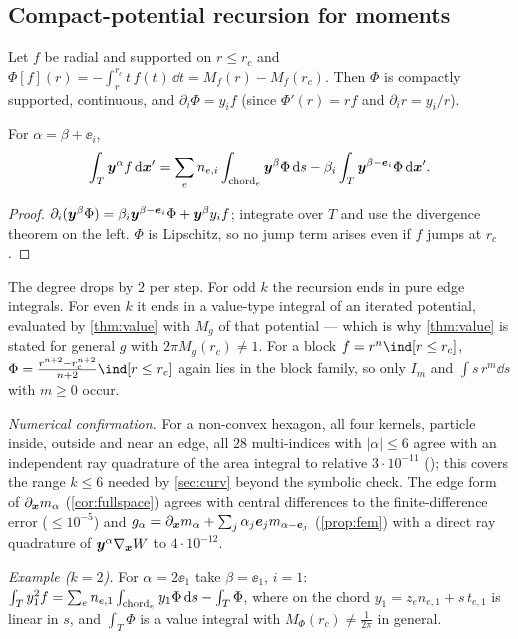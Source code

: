 \subsection{Compact-potential recursion for moments}
Let $f$ be radial and supported on $r\le r_c$ and $\Phi[f](r)=-\int_r^{r_c}t\,f(t)\,\dd t=M_f(r)-M_f(r_c)$. Then $\Phi$ is compactly
supported, continuous, and $\partial_i\Phi=y_if$ (since $\Phi'(r)=rf$ and $\partial_i r=y_i/r$).
\begin{theorem}[Recursion]\label{thm:recursion}
For $\alpha=\beta+\ee_i$,
\begin{equation}\label{eq:recursion}
 \int_T\bm y^{\alpha}f\,\mathrm{d}\bm x'=\sum_en_{e,i}\int_{\mathrm{chord}_e}\bm y^{\beta}\Phi\,\mathrm{d} s-\beta_i\int_T\bm y^{\beta-\bm e_i}\Phi\,\mathrm{d}\bm x'.
\end{equation}
\end{theorem}
\begin{proof}
$\partial_i(\bm y^\beta\Phi)=\beta_i\bm y^{\beta-\bm e_i}\Phi+\bm y^{\beta}y_if$; integrate over $T$ and use the divergence theorem on the left.
$\Phi$ is Lipschitz, so no jump term arises even if $f$ jumps at $r_c$. 
\end{proof}
The degree drops by $2$ per step. For odd $k$ the recursion ends in pure edge integrals. For even $k$ it ends in a
value-type integral of an iterated potential, evaluated by \cref{thm:value} with $M_g$ of that potential --- which is why \cref{thm:value}
is stated for general $g$ with $2\pi M_g(r_c)\neq1$. For a block $f=r^n\ind[r\le r_c]$, $\Phi=\frac{r^{n+2}-r_c^{n+2}}{n+2}\ind[r\le r_c]$ again lies in the
block family, so only $I_m$ and $\int s\,r^m\dd s$ with $m\ge0$ occur.

\emph{Numerical confirmation.} For a non-convex hexagon, all four kernels, particle inside, outside and near an edge, all $28$ multi-indices with $|\alpha|\le6$
agree with an independent ray quadrature of the area integral to relative $3\cdot10^{-11}$ (); this covers the range $k\le6$ needed by \cref{sec:curv}
beyond the symbolic check. The edge form of $\partial_{\bm x}m_\alpha$ (\cref{cor:fullspace}) agrees with central differences to the finite-difference error ($\le10^{-5}$) and
$g_\alpha=\partial_{\bm x}m_\alpha+\sum_j\alpha_j\bm e_jm_{\alpha-\bm e_j}$ (\cref{prop:fem}) with a direct ray quadrature of $\bm y^\alpha\nabla_{\bm x}W$ to $4\cdot10^{-12}$. 

\emph{Example ($k=2$).} For $\alpha=2\ee_1$ take $\beta=\ee_1$, $i=1$:
$\int_Ty_1^2f=\sum_en_{e,1}\int_{\mathrm{chord}_e}y_1\Phi\,\mathrm{d} s-\int_T\Phi$, where on the chord $y_1=z_en_{e,1}+s\,t_{e,1}$ is linear in $s$, and
$\int_T\Phi$ is a value integral with $M_\Phi(r_c)\ne\frac1{2\pi}$ in general.

